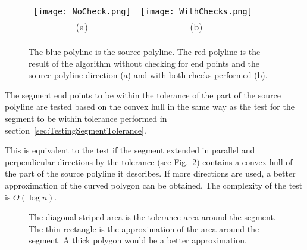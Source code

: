 \documentclass[conference]{IEEEtran}
\begin{document}
\begin{figure} [hb]
  \centering
  \begin{tabular}{c c c}
    \texttt{[image: NoCheck.png]} &
    \texttt{[image: WithChecks.png]} \\
    (a) &
    (b)
  \end{tabular}
  \caption
  {
    The blue polyline is the source polyline. The red polyline is the result of the algorithm without checking for end points and the source polyline direction (a) and with both checks performed (b).
  }
  \label{fig:TopologycalTest}
\end{figure}

The segment end points to be within the tolerance of the part of the source polyline are tested based on the convex hull in the same way as the test for the segment to be within tolerance performed in section~\ref{sec:TestingSegmentTolerance}.

This is equivalent to the test if the segment extended in parallel and perpendicular directions by the tolerance (see Fig.~\ref{fig:SegmentEndPoints}) contains a convex hull of the part of the source polyline it describes. If more directions are used, a better approximation of the curved polygon can be obtained. The complexity of the test is $O{\left( \log{n} \right)}$.

\begin{figure} [htb]
  \centering
  \caption
  {
    The diagonal striped area is the tolerance area around the segment. The thin rectangle is the approximation of the area around the segment. A thick polygon would be a better approximation.
  }
  \label{fig:SegmentEndPoints}
\end{figure}
\end{document}
